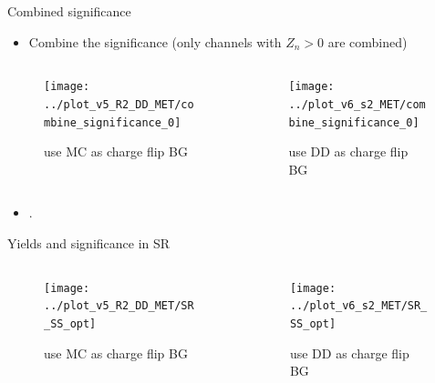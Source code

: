 \documentclass[mathserif,serif]{beamer}
\begin{document}
\begin{frame}{Combined significance}
\tiny
\begin{itemize}
\item Combine the significance (only channels with $Z_n>0$ are combined)
\end{itemize}

\begin{columns}

\begin{column}{0.4\textwidth}
\begin{figure}
\texttt{[image: ../plot\_v5\_R2\_DD\_MET/combine\_significance\_0]}
\caption{\tiny use MC as charge flip BG}
\end{figure}
\end{column}


\begin{column}{0.4\textwidth}
\begin{figure}
\texttt{[image: ../plot\_v6\_s2\_MET/combine\_significance\_0]}
\caption{\tiny use DD as charge flip BG}
\end{figure}
\end{column}

\end{columns}

\begin{itemize}
\item .
\end{itemize}
\end{frame}

\begin{frame}{Yields and significance in SR}

\begin{columns}

\begin{column}{0.4\textwidth}
\begin{figure}
\texttt{[image: ../plot\_v5\_R2\_DD\_MET/SR\_SS\_opt]}
\caption{\tiny use MC as charge flip BG}
\end{figure}
\end{column}

\begin{column}{0.4\textwidth}
\begin{figure}
\texttt{[image: ../plot\_v6\_s2\_MET/SR\_SS\_opt]}
\caption{\tiny use DD as charge flip BG}
\end{figure}
\end{column}

\end{columns}

\end{frame}
\end{document}
